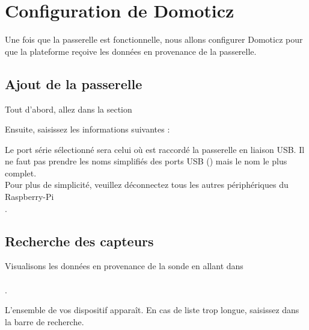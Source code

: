 \chapter{Configuration de Domoticz}

Une fois que la passerelle est fonctionnelle, nous allons configurer Domoticz pour que la plateforme reçoive 
les données en provenance de la passerelle.

\section{Ajout de la passerelle}

Tout d'abord, allez dans la section 


Ensuite, saisissez les informations suivantes :


Le port série sélectionné sera celui où est raccordé la passerelle en liaison USB.
Il ne faut pas prendre les noms simplifiés des ports USB () mais le nom le plus complet.\\
Pour plus de simplicité, veuillez déconnectez tous les autres périphériques du Raspberry-Pi\\.


\section{Recherche des capteurs}

Visualisons les données en provenance de la sonde en allant dans \\
\\.

L'ensemble de vos dispositif apparaît. En cas de liste trop longue, saisissez  dans la barre de recherche.








